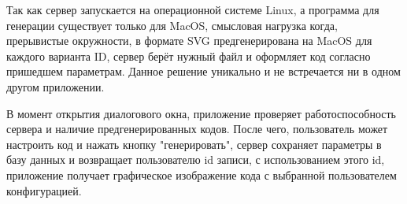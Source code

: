       Так как сервер запускается на операционной системе Linux, а программа для генерации существует только для MacOS, смысловая нагрузка когда, прерывистые окружности, в формате SVG предгенерирована на MacOS для каждого варианта ID, сервер берёт нужный файл и оформляет код согласно пришедшем параметрам. Данное решение уникально и не встречается ни в одном другом приложении.


      В момент открытия диалогового окна, приложение проверяет работоспособность сервера и наличие предгенерированных кодов. После чего, пользователь может настроить код и нажать кнопку "генерировать", сервер сохраняет параметры в базу данных и возвращает пользователю id записи, с использованием этого id, приложение получает графическое изображение кода с выбранной пользователем конфигурацией.

